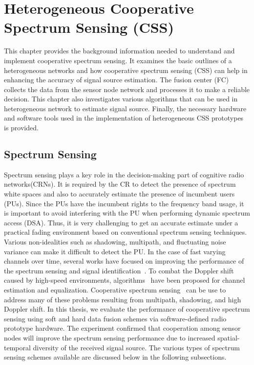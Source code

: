 \chapter{Heterogeneous Cooperative Spectrum Sensing (CSS)}
\label{chapter3}

This chapter provides the background information needed to understand and implement cooperative spectrum sensing. It examines the basic outlines of a heterogeneous networks and how cooperative spectrum sensing (CSS) can help in enhancing the accuracy of signal source estimation. The fusion center (FC) collects the data from the sensor node network and processes it to make a reliable decision. This chapter also investigates various algorithms that can be used in heterogeneous network to estimate signal source. Finally, the necessary hardware and software tools used in the implementation of heterogeneous CSS prototypes is provided.

\section{Spectrum Sensing}
Spectrum sensing plays a key role in the decision-making part of cognitive radio networks(CRNs). It is required by the CR to detect the presence of spectrum white spaces and also to accurately estimate the presence of incumbent users (PUs). Since the PUs have the incumbent rights to the frequency band usage, it is important to avoid interfering with the PU when performing dynamic spectrum access (DSA). Thus, it is very challenging to get an accurate estimate under a practical fading environment based on conventional spectrum sensing techniques. Various non-idealities such as shadowing, multipath, and fluctuating noise variance can make it difficult to detect the PU. In the case of fast  varying  channels over time, several works have focused on improving the performance of the spectrum sensing and signal identification~\cite{hassan2012blind,kharbech2013blind,hassan2009automatic}. To combat the Doppler shift caused by high-speed environments, algorithms~\cite{simon2013iterative} have been proposed for channel estimation and equalization. Cooperative spectrum sensing~\cite{ksgill} can be use to address many of these problems resulting from multipath, shadowing, and high Doppler shift. In this thesis, we evaluate the performance of cooperative spectrum sensing using soft and hard data fusion schemes via software-defined radio prototype hardware. The experiment confirmed that cooperation among sensor nodes will improve the spectrum sensing performance due to increased spatial-temporal diversity of the received signal source. The various types of spectrum sensing schemes available are discussed below in the following subsections.

